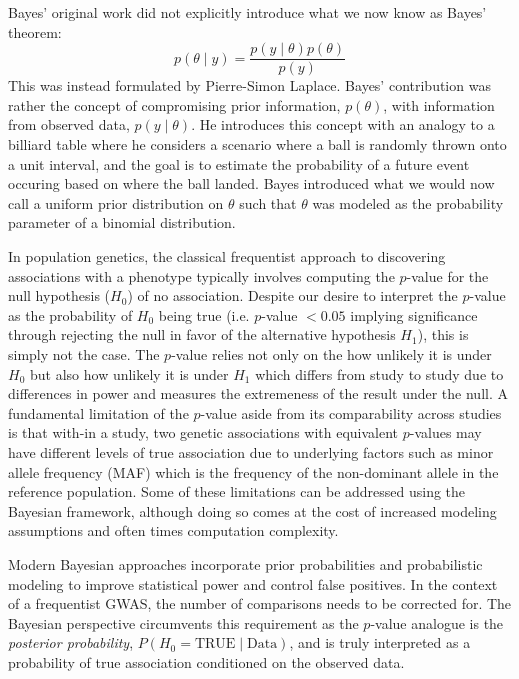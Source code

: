 \documentclass{article}\usepackage[]{graphicx}\usepackage[]{color}
\begin{document}
\noindent
Bayes' original work did not explicitly introduce what we now know as Bayes' theorem:
$$p(\theta \mid y) = \frac{p(y \mid \theta)p(\theta)}{p(y)}$$
This was instead formulated by Pierre-Simon Laplace. Bayes' contribution was rather the concept of compromising prior information, $p(\theta)$, with information from observed data, $p(y \mid \theta)$. He introduces this concept with an analogy to a billiard table where he considers a scenario where a ball is randomly thrown onto a unit interval, and the goal is to estimate the probability of a future event occuring based on where the ball landed. Bayes introduced what we would now call a uniform prior distribution on $\theta$ such that $\theta$ was modeled as the probability parameter of a binomial distribution\cite{bayesLIIEssaySolving1997,fienbergWhenDidBayesian2006}. 
\par
In population genetics, the classical frequentist approach to discovering associations with a phenotype typically involves computing the $p$-value for the null hypothesis ($H_0$) of no association. Despite our desire to interpret the $p$-value as the probability of $H_0$ being true (i.e. $p$-value $< 0.05$ implying significance through rejecting the null in favor of the alternative hypothesis $H_1$), this is simply not the case. The $p$-value relies not only on the how unlikely it is under $H_0$ but also how unlikely it is under $H_1$ which differs from study to study due to differences in power and measures the extremeness of the result under the null\cite{lesaffreBayesianBiostatistics2012}. A fundamental limitation of the $p$-value aside from its comparability across studies is that with-in a study, two genetic associations with equivalent $p$-values may have different levels of true association due to underlying factors such as minor allele frequency (MAF) which is the frequency of the non-dominant allele in the reference population. Some of these limitations can be addressed using the Bayesian framework, although doing so comes at the cost of increased modeling assumptions and often times computation complexity\cite{stephensBayesianStatisticalMethods2009}. 
\par
Modern Bayesian approaches incorporate prior probabilities and probabilistic modeling to improve statistical power and control false positives. In the context of a frequentist GWAS, the number of comparisons needs to be corrected for. The Bayesian perspective circumvents this requirement as the $p$-value analogue is the \textit{posterior probability}, $P(H_0 = \text{TRUE} \mid \text{Data})$, and is truly interpreted as a probability of true association conditioned on the observed data\cite{lesaffreBayesianBiostatistics2012}.
\end{document}
